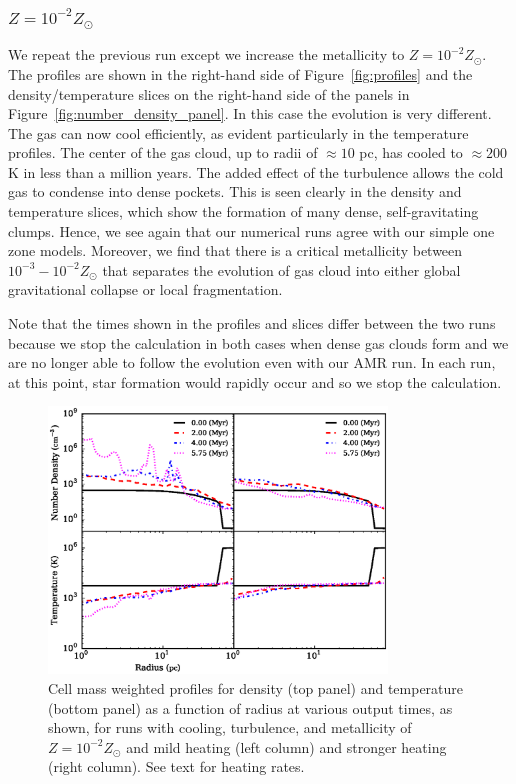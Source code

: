 \documentclass[useAMS,usenatbib]{mn2e}
\begin{document}
\subsubsection{$Z=10^{-2}Z_\odot$}

We repeat the previous run except we increase the metallicity to $Z=10^{-2}Z_\odot$.  The profiles are shown
in the right-hand side of Figure~\ref{fig:profiles} and the density/temperature slices on the right-hand side of the panels in Figure~\ref{fig:number_density_panel}.  In this case the evolution is very different.
The gas can now cool efficiently, as evident particularly in the temperature profiles.   The center
of the gas cloud, up to radii of $\approx 10$ pc, has cooled to $\approx 200$ K in less than a million years. The added effect of the turbulence
allows the cold gas to condense into dense pockets.  This is seen clearly in the density and temperature slices, which show the formation of many dense, self-gravitating clumps.  
Hence, we see again that our numerical runs agree with our simple one zone models. Moreover, we find that there is a critical metallicity
between $10^{-3}-10^{-2}Z_\odot$ that separates the evolution of gas cloud into either global gravitational collapse or local fragmentation. 

Note that the times shown in the profiles and slices differ between the two runs because we stop the calculation in both cases when dense gas clouds form and we are no longer able to follow the evolution even with our AMR run.  In each run, at this point, star formation would rapidly occur and so we stop the calculation.

\begin{figure}
\begin{center}
\includegraphics[width=9.0cm]{Images/profile_heating}
\end{center}
\caption{\label{fig:profiles_heating} Cell mass weighted profiles for 
density (top panel) and temperature (bottom panel) as a function of radius at various 
output times, as shown, for runs with cooling, turbulence, and metallicity of $Z=10^{-2}Z_\odot$
and mild heating (left column) and stronger heating (right column).  See text for heating rates.}
\end{figure}
\end{document}
